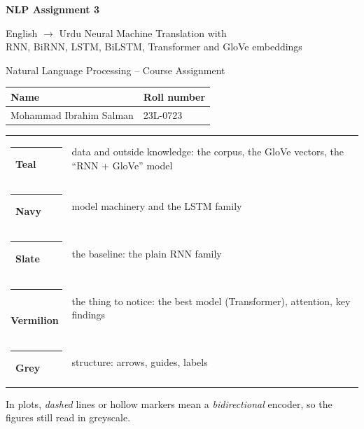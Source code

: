 \documentclass[11pt,a4paper]{article}
\begin{document}
\begin{titlepage}
\centering\setlength{\parindent}{0pt}
\vspace*{3.4cm}
{\fontsize{30}{36}\selectfont\bfseries\color{cModel} NLP Assignment 3\par}
\vspace{0.9cm}
{\Large English $\rightarrow$ Urdu Neural Machine Translation with\\[3pt]
RNN, BiRNN, LSTM, BiLSTM, Transformer and GloVe embeddings\par}
\vspace{1.1cm}
{\large\color{cNeutral} Natural Language Processing -- Course Assignment\par}

\vspace{2.0cm}
{\large
\begin{tabular}{@{}ll@{}}
\toprule
\textbf{Name} & \textbf{Roll number}\\
\midrule
Mohammad Ibrahim Salman & 23L-0723\\
\bottomrule
\end{tabular}\par}

\vfill
\par
\vspace*{1.6cm}
\end{titlepage}

\tableofcontents
\vspace{0.6cm}
\begin{notebox}
\begin{tabular}{@{}p{3.2cm}p{11.6cm}@{}}
\textcolor{cData}{\rule{8pt}{8pt}}\, \textbf{Teal} & data and outside knowledge: the corpus, the GloVe vectors, the ``RNN + GloVe'' model\\
\textcolor{cModel}{\rule{8pt}{8pt}}\, \textbf{Navy} & model machinery and the LSTM family\\
\textcolor{cBase}{\rule{8pt}{8pt}}\, \textbf{Slate} & the baseline: the plain RNN family\\
\textcolor{cKey}{\rule{8pt}{8pt}}\, \textbf{Vermilion} & the thing to notice: the best model (Transformer), attention, key findings\\
\textcolor{cNeutral}{\rule{8pt}{8pt}}\, \textbf{Grey} & structure: arrows, guides, labels\\
\end{tabular}

\smallskip
In plots, \emph{dashed} lines or hollow markers mean a \emph{bidirectional} encoder, so the figures still read in greyscale.
\end{notebox}
\end{document}
